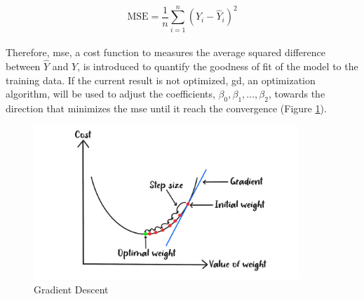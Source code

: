\\
\begin{equation} \label{eq:mse}
    \text{MSE} = \frac{1}{n} \sum_{i=1}^{n} (Y_i - \hat{Y}_i)^2
\end{equation}
\\
Therefore, \gls{mse}, a cost function to measures the average squared difference between $\hat{Y}$ and $Y$, is introduced to quantify the goodness of fit of the model to the training data. 
If the current result is not optimized, \gls{gd}, an optimization algorithm, will be used to adjust the coefficients, $\beta_0, \beta_1,...,\beta_2$, towards the direction that minimizes the \gls{mse} until it reach the convergence (Figure \ref{fig:gd}).
\\
\begin{figure}[!ht]
    \centering
    \includegraphics[width=10cm]{Images/gd.png}
    \caption{Gradient Descent}
    \label{fig:gd}
\end{figure}
\\
